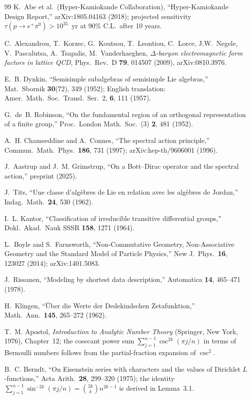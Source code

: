 \documentclass[aps,prd,twocolumn,superscriptaddress,floatfix,nofootinbib]{revtex4-2}
\theoremstyle{definition}
\theoremstyle{remark}
\begin{document}
\begin{thebibliography}{99}
 K.~Abe et al.\ (Hyper-Kamiokande Collaboration), ``Hyper-Kamiokande
Design Report,'' arXiv:1805.04163 (2018); projected sensitivity
$\tau(p \to e^+\pi^0) > 10^{35}$~yr at 90\% C.L.\ after 10 years.

 C.~Alexandrou, T.~Korzec, G.~Koutsou, T.~Leontiou, C.~Lorce, J.W.~Negele, V.~Pascalutsa, A.~Tsapalis, M.~Vanderhaeghen, \emph{$\Delta$-baryon electromagnetic form factors in lattice QCD}, Phys.\ Rev.\ D \textbf{79}, 014507 (2009), arXiv:0810.3976.

 E.~B. Dynkin, ``Semisimple subalgebras of semisimple Lie algebras,'' Mat.\ Sbornik \textbf{30}(72), 349 (1952); English translation: Amer.\ Math.\ Soc.\ Transl.\ Ser.~2, \textbf{6}, 111 (1957).

 G.~de~B. Robinson, ``On the fundamental region of an orthogonal representation of a finite group,'' Proc.\ London Math.\ Soc.\ (3) \textbf{2}, 481 (1952).

 A.~H. Chamseddine and A.~Connes, ``The spectral action principle,'' Commun.\ Math.\ Phys.\ \textbf{186}, 731 (1997); arXiv:hep-th/9606001 (1996).

 J.~Aastrup and J.~M. Grimstrup, ``On a Bott--Dirac operator and the spectral action,'' preprint (2025).

 J.~Tits, ``Une classe d'alg\`ebres de Lie en relation avec les alg\`ebres de Jordan,'' Indag.\ Math.\ \textbf{24}, 530 (1962).

 I.~L. Kantor, ``Classification of irreducible transitive differential groups,'' Dokl.\ Akad.\ Nauk SSSR \textbf{158}, 1271 (1964).

 L.~Boyle and S.~Farnsworth, ``Non-Commutative Geometry, Non-Associative Geometry and the Standard Model of Particle Physics,'' New J.\ Phys.\ \textbf{16}, 123027 (2014); arXiv:1401.5083.

 J.~Rissanen, ``Modeling by shortest data description,'' Automatica \textbf{14}, 465--471 (1978).

 H.~Klingen, ``\"Uber die Werte der Dedekindschen Zetafunktion,'' Math.\ Ann.\ \textbf{145}, 265--272 (1962).

 T.~M. Apostol, \textit{Introduction to Analytic Number Theory}
(Springer, New York, 1976), Chapter~12; the cosecant power sum
$\sum_{j=1}^{n-1}\csc^{2k}(\pi j/n)$ in terms of Bernoulli numbers follows from
the partial-fraction expansion of $\csc^2$.

 B.~C. Berndt, ``On Eisenstein series with characters
and the values of Dirichlet $L$-functions,'' Acta Arith.\ \textbf{28}, 299--320
(1975); the identity $\sum_{j=1}^{n-1}\sin^{-2k}(\pi j/n) = \binom{2k}{k}n^{2k-1}$
is derived in Lemma~3.1.

\end{thebibliography}
\end{document}
